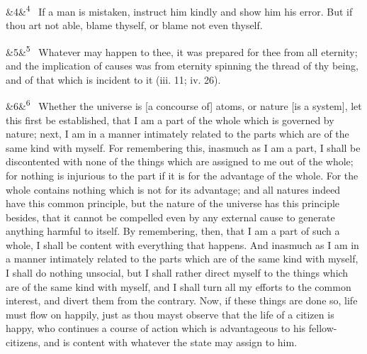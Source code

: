 \documentclass[12pt]{article}
\newcommand{\para}[1][]{\par\noindent\ifx&#1&\else\textsuperscript{\footnotesize #1}~\fi}
\begin{document}
\para[4] If a man is mistaken, instruct him kindly and show him his error. But
if thou art not able, blame thyself, or blame not even thyself.

\para[5] Whatever may happen to thee, it was prepared for thee from all
eternity; and the implication of causes was from eternity spinning the
thread of thy being, and of that which is incident to it (iii. 11; iv.
26).

\para[6] Whether the universe is [a concourse of] atoms, or nature [is a
system], let this first be established, that I am a part of the whole
which is governed by nature; next, I am in a manner intimately related
to the parts which are of the same kind with myself. For remembering
this, inasmuch as I am a part, I shall be discontented with none of the
things which are assigned to me out of the whole; for nothing is
injurious to the part if it is for the advantage of the whole. For the
whole contains nothing which is not for its advantage; and all natures
indeed have this common principle, but the nature of the universe has
this principle besides, that it cannot be compelled even by any external
cause to generate anything harmful to itself. By remembering, then, that
I am a part of such a whole, I shall be content with everything that
happens. And inasmuch as I am in a manner intimately related to the
parts which are of the same kind with myself, I shall do nothing
unsocial, but I shall rather direct myself to the things which are of
the same kind with myself, and I shall turn all my efforts to the common
interest, and divert them from the contrary. Now, if these things are
done so, life must flow on happily, just as thou mayst observe that the
life of a citizen is happy, who continues a course of action which is
advantageous to his fellow-citizens, and is content with whatever the
state may assign to him.
\end{document}
